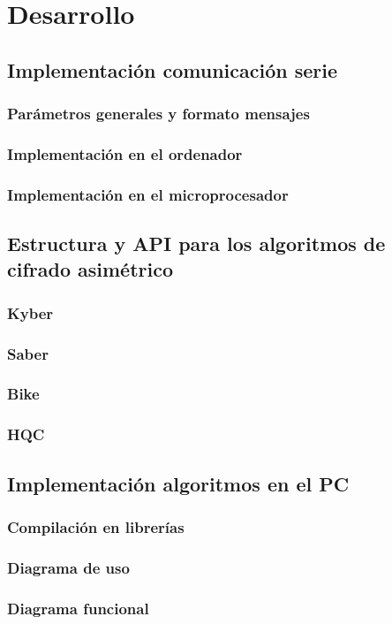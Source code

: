 \chapter{Desarrollo}
\section{Implementación comunicación serie}
\subsection{Parámetros generales y formato mensajes}
\subsection{Implementación en el ordenador}
\subsection{Implementación en el microprocesador}
\section{Estructura y API para los algoritmos de cifrado asimétrico}
\subsection{Kyber}
\subsection{Saber}
\subsection{Bike}
\subsection{HQC}
\section{Implementación algoritmos en el PC}
\subsection{Compilación en librerías}
\subsection{Diagrama de uso}
\subsection{Diagrama funcional}

